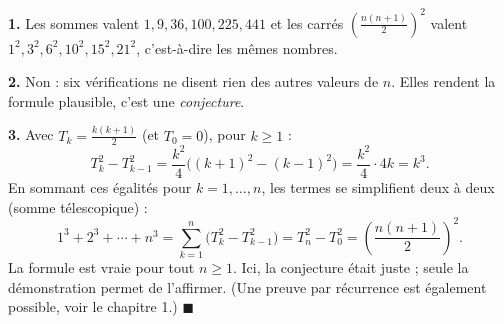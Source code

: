 \textbf{1.} Les sommes valent $1, 9, 36, 100, 225, 441$ et les carrés
$\left(\frac{n(n+1)}{2}\right)^2$ valent $1^2, 3^2, 6^2, 10^2, 15^2, 21^2$,
c'est-à-dire les mêmes nombres.

\textbf{2.} Non : six vérifications ne disent rien des autres valeurs de $n$.
Elles rendent la formule plausible, c'est une \emph{conjecture}.

\textbf{3.} Avec $T_k = \frac{k(k+1)}{2}$ (et $T_0 = 0$), pour $k \geqslant 1$ :
\[
T_k^2 - T_{k-1}^2 = \frac{k^2}{4}\bigl((k+1)^2 - (k-1)^2\bigr) = \frac{k^2}{4} \cdot 4k = k^3 .
\]
En sommant ces égalités pour $k = 1, \ldots, n$, les termes se simplifient
deux à deux (somme télescopique) :
\[
1^3 + 2^3 + \cdots + n^3 = \sum_{k=1}^{n} \bigl(T_k^2 - T_{k-1}^2\bigr) = T_n^2 - T_0^2
= \left( \frac{n(n+1)}{2} \right)^{2}.
\]
La formule est vraie pour tout $n \geqslant 1$. Ici, la conjecture était
juste ; seule la démonstration permet de l'affirmer. (Une preuve par
récurrence est également possible, voir le chapitre 1.)
\hfill $\blacksquare$
